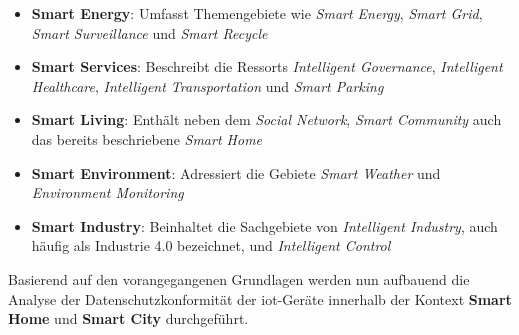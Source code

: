 \begin{itemize}
	\item \textbf{Smart Energy}: Umfasst Themengebiete wie \textit{Smart Energy}, \textit{Smart Grid}, \textit{Smart Surveillance} und \textit{Smart Recycle}
	\item \textbf{Smart Services}: Beschreibt die Ressorts \textit{Intelligent Governance}, \textit{Intelligent Healthcare}, \textit{Intelligent Transportation} und \textit{Smart Parking}
	\item \textbf{Smart Living}: Enthält neben dem \textit{Social Network}, \textit{Smart Community} auch das bereits beschriebene \textit{Smart Home}
	\item \textbf{Smart Environment}: Adressiert die Gebiete \textit{Smart Weather} und \textit{Environment Monitoring}
	\item \textbf{Smart Industry}: Beinhaltet die Sachgebiete von \textit{Intelligent Industry}, auch häufig als Industrie 4.0 bezeichnet, und \textit{Intelligent Control}
\end{itemize}

\noindent Basierend auf den vorangegangenen Grundlagen werden nun aufbauend die Analyse der Datenschutzkonformität der \ac{iot}-Geräte innerhalb der Kontext \textbf{Smart Home} und \textbf{Smart City} durchgeführt.
